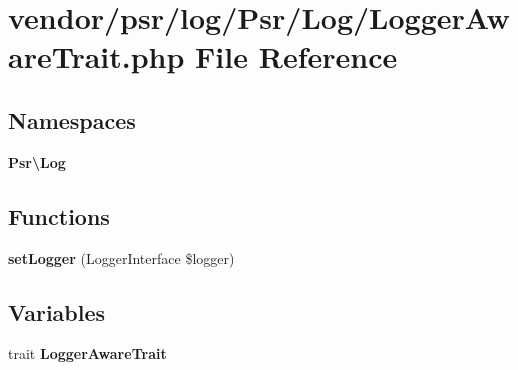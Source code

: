 \section{vendor/psr/log/\+Psr/\+Log/\+Logger\+Aware\+Trait.php File Reference}
\label{_logger_aware_trait_8php}
\subsection*{Namespaces}
\begin{DoxyCompactItemize}
\item 
 {\bf Psr\textbackslash{}\+Log}
\end{DoxyCompactItemize}
\subsection*{Functions}
\begin{DoxyCompactItemize}
\item 
{\bf set\+Logger} (Logger\+Interface \$logger)
\end{DoxyCompactItemize}
\subsection*{Variables}
\begin{DoxyCompactItemize}
\item 
trait {\bf Logger\+Aware\+Trait}
\end{DoxyCompactItemize}
